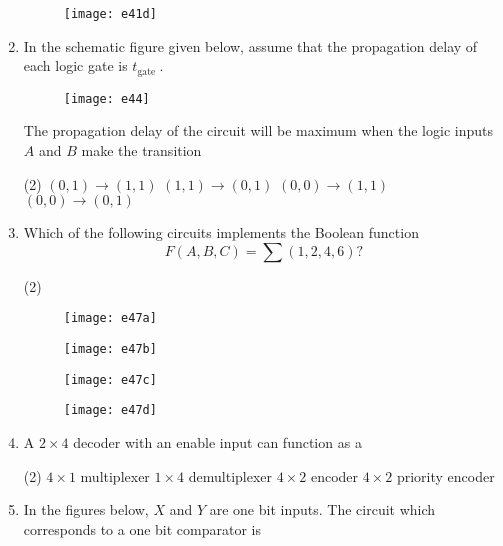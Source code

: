 \begin{enumerate}
\begin{tasks}
\begin{figure}[H]
			\centering
			\texttt{[image: e41d]}
		\end{figure}
	\end{tasks}
	\item In the schematic figure given below, assume that the propagation delay of each logic gate is $t_{\text {gate }}$.\\
	\begin{figure}[H]
		\centering
		\texttt{[image: e44]}
	\end{figure}
	The propagation delay of the circuit will be maximum when the logic inputs $A$ and $B$ make the transition
	{}
	\begin{tasks}(2)
		\task[\textbf{A.}] $(0,1) \rightarrow(1,1)$
		\task[\textbf{B.}] $(1,1) \rightarrow(0,1)$
		\task[\textbf{C.}] $(0,0) \rightarrow(1,1)$
		\task[\textbf{D.}] 	$(0,0) \rightarrow(0,1)$
	\end{tasks}
	\item Which of the following circuits implements the Boolean function
	$$F(A, B, C)=\sum(1,2,4,6) ?$$
	{	}
	\begin{tasks}(2)
		\task[\textbf{A.}] \begin{figure}[H]
			\centering
			\texttt{[image: e47a]}
		\end{figure}
		\task[\textbf{B.}] \begin{figure}[H]
			\centering
			\texttt{[image: e47b]}
		\end{figure}
		\task[\textbf{C.}] \begin{figure}[H]
			\centering
			\texttt{[image: e47c]}
		\end{figure}
		\task[\textbf{D.}] \begin{figure}[H]
			\centering
			\texttt{[image: e47d]}
		\end{figure}
	\end{tasks}
	\item A $2 \times 4$ decoder with an enable input can function as a
	{	}
	\begin{tasks}(2)
		\task[\textbf{A.}] $4 \times 1$ multiplexer
		\task[\textbf{B.}] $1 \times 4$ demultiplexer
		\task[\textbf{C.}] $4 \times 2$ encoder
		\task[\textbf{D.}] $4 \times 2$ priority encoder
	\end{tasks}
	\item In the figures below, $X$ and $Y$ are one bit inputs. The circuit which corresponds to a one bit comparator is

\end{enumerate}
